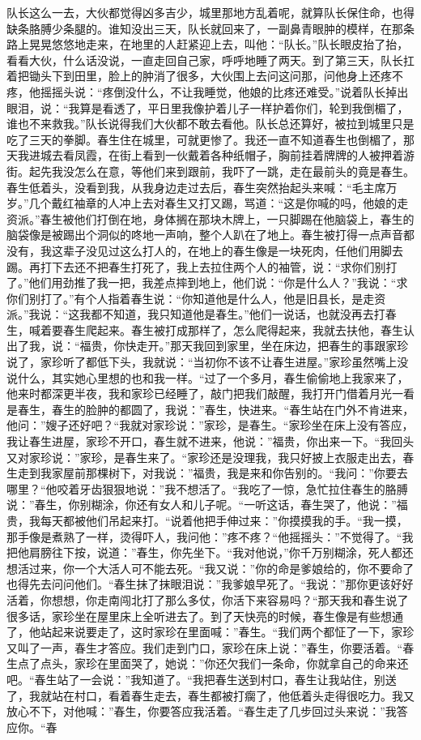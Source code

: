 \documentclass[12pt,UTF8]{ctexbook}
\begin{document}
队长这么一去，大伙都觉得凶多吉少，城里那地方乱着呢，就算队长保住命，也得缺条胳膊少条腿的。谁知没出三天，队长就回来了，一副鼻青眼肿的模样，在那条路上晃晃悠悠地走来，在地里的人赶紧迎上去，叫他：“队长。”队长眼皮抬了抬，看看大伙，什么话没说，一直走回自己家，呼呼地睡了两天。到了第三天，队长扛着把锄头下到田里，脸上的肿消了很多，大伙围上去问这问那，问他身上还疼不疼，他摇摇头说：“疼倒没什么，不让我睡觉，他娘的比疼还难受。”说着队长掉出眼泪，说：“我算是看透了，平日里我像护着儿子一样护着你们，轮到我倒楣了，谁也不来救我。”队长说得我们大伙都不敢去看他。队长总还算好，被拉到城里只是吃了三天的拳脚。春生住在城里，可就更惨了。我还一直不知道春生也倒楣了，那天我进城去看凤霞，在街上看到一伙戴着各种纸帽子，胸前挂着牌牌的人被押着游街。起先我没怎么在意，等他们来到跟前，我吓了一跳，走在最前头的竟是春生。春生低着头，没看到我，从我身边走过去后，春生突然抬起头来喊：“毛主席万岁。”几个戴红袖章的人冲上去对春生又打又踢，骂道：“这是你喊的吗，他娘的走资派。”春生被他们打倒在地，身体搁在那块木牌上，一只脚踢在他脑袋上，春生的脑袋像是被踢出个洞似的咚地一声响，整个人趴在了地上。春生被打得一点声音都没有，我这辈子没见过这么打人的，在地上的春生像是一块死肉，任他们用脚去踢。再打下去还不把春生打死了，我上去拉住两个人的袖管，说：“求你们别打了。”他们用劲推了我一把，我差点摔到地上，他们说：“你是什么人？”我说：“求你们别打了。”有个人指着春生说：“你知道他是什么人，他是旧县长，是走资派。”我说：“这我都不知道，我只知道他是春生。”他们一说话，也就没再去打春生，喊着要春生爬起来。春生被打成那样了，怎么爬得起来，我就去扶他，春生认出了我，说：“福贵，你快走开。”那天我回到家里，坐在床边，把春生的事跟家珍说了，家珍听了都低下头，我就说：“当初你不该不让春生进屋。”家珍虽然嘴上没说什么，其实她心里想的也和我一样。“过了一个多月，春生偷偷地上我家来了，他来时都深更半夜，我和家珍已经睡了，敲门把我们敲醒，我打开门借着月光一看是春生，春生的脸肿的都圆了，我说：”春生，快进来。“春生站在门外不肯进来，他问：”嫂子还好吧？“我就对家珍说：”家珍，是春生。“家珍坐在床上没有答应，我让春生进屋，家珍不开口，春生就不进来，他说：”福贵，你出来一下。“我回头又对家珍说：”家珍，是春生来了。“家珍还是没理我，我只好披上衣服走出去，春生走到我家屋前那棵树下，对我说：”福贵，我是来和你告别的。“我问：”你要去哪里？“他咬着牙齿狠狠地说：”我不想活了。“我吃了一惊，急忙拉住春生的胳膊说：”春生，你别糊涂，你还有女人和儿子呢。“一听这话，春生哭了，他说：”福贵，我每天都被他们吊起来打。“说着他把手伸过来：”你摸摸我的手。“我一摸，那手像是煮熟了一样，烫得吓人，我问他：”疼不疼？“他摇摇头：”不觉得了。“我把他肩膀往下按，说道：”春生，你先坐下。“我对他说，”你千万别糊涂，死人都还想活过来，你一个大活人可不能去死。“我又说：”你的命是爹娘给的，你不要命了也得先去问问他们。“春生抹了抹眼泪说：”我爹娘早死了。“我说：”那你更该好好活着，你想想，你走南闯北打了那么多仗，你活下来容易吗？“那天我和春生说了很多话，家珍坐在屋里床上全听进去了。到了天快亮的时候，春生像是有些想通了，他站起来说要走了，这时家珍在里面喊：”春生。“我们两个都怔了一下，家珍又叫了一声，春生才答应。我们走到门口，家珍在床上说：”春生，你要活着。“春生点了点头，家珍在里面哭了，她说：”你还欠我们一条命，你就拿自己的命来还吧。“春生站了一会说：”我知道了。“我把春生送到村口，春生让我站住，别送了，我就站在村口，看着春生走去，春生都被打瘸了，他低着头走得很吃力。我又放心不下，对他喊：”春生，你要答应我活着。“春生走了几步回过头来说：”我答应你。“春
\end{document}
